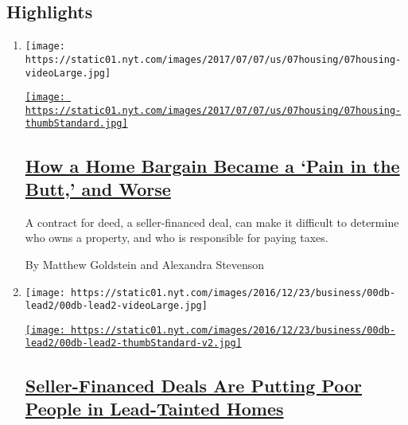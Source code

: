 \hypertarget{highlights}{%
\subsection{Highlights}\label{highlights}}

\begin{enumerate}
\def\labelenumi{\arabic{enumi}.}
\item
  \texttt{[image: https://static01.nyt.com/images/2017/07/07/us/07housing/07housing-videoLarge.jpg]}

  \href{/2017/07/07/business/dealbook/how-a-home-bargain-became-a-pain-in-the-butt-and-worse.html}{\texttt{[image: https://static01.nyt.com/images/2017/07/07/us/07housing/07housing-thumbStandard.jpg]}}

  \hypertarget{how-a-home-bargain-became-a-pain-in-the-butt-and-worse}{%
  \subsection{\texorpdfstring{\href{/2017/07/07/business/dealbook/how-a-home-bargain-became-a-pain-in-the-butt-and-worse.html}{How
  a Home Bargain Became a `Pain in the Butt,' and
  Worse}}{How a Home Bargain Became a `Pain in the Butt,' and Worse}}\label{how-a-home-bargain-became-a-pain-in-the-butt-and-worse}}

  A contract for deed, a seller-financed deal, can make it difficult to
  determine who owns a property, and who is responsible for paying
  taxes.

  By Matthew Goldstein and Alexandra Stevenson
\item
  \texttt{[image: https://static01.nyt.com/images/2016/12/23/business/00db-lead2/00db-lead2-videoLarge.jpg]}

  \href{/2016/12/26/business/dealbook/seller-financed-home-sales-poor-people-lead-paint.html}{\texttt{[image: https://static01.nyt.com/images/2016/12/23/business/00db-lead2/00db-lead2-thumbStandard-v2.jpg]}}

  \hypertarget{seller-financed-deals-are-putting-poor-people-in-lead-tainted-homes}{%
  \subsection{\texorpdfstring{\href{/2016/12/26/business/dealbook/seller-financed-home-sales-poor-people-lead-paint.html}{Seller-Financed
  Deals Are Putting Poor People in Lead-Tainted
  Homes}}{Seller-Financed Deals Are Putting Poor People in Lead-Tainted Homes}}\label{seller-financed-deals-are-putting-poor-people-in-lead-tainted-homes}}


\end{enumerate}
